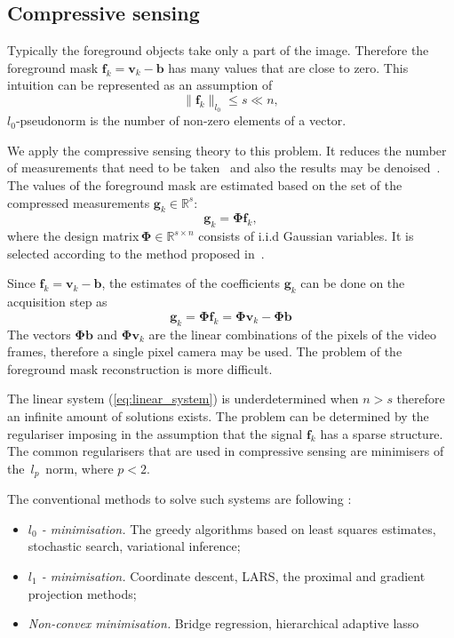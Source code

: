 \documentclass[conference]{IEEEtran}
\begin{document}
\subsection{Compressive sensing}
Typically the foreground objects take only a part of the image. Therefore the foreground mask $\mathbf{f}_k=\mathbf{v}_k-\mathbf{b}$ has many values that are close to zero. This intuition can be represented as an assumption of
\begin{equation}
\|\mathbf{f}_k\|_{l_0}\le s \ll n,
\end{equation}
$l_0$-pseudonorm is the number of non-zero elements of a vector.
 
We apply the compressive sensing theory to this problem. It reduces the number of measurements that need to be taken~\cite{Candes2008intro} and also the results may be denoised~\cite{Bach14}. The values of the foreground mask are estimated based on the set of the compressed measurements $\mathbf{g}_k \in \mathbb{R}^{s}$: 
\begin{equation}
\mathbf{g}_k = \mathbf{\Phi} \mathbf{f}_k, 
\end{equation}
where the design matrix\,$\mathbf{\Phi}\in\mathbb{R}^{s \times n}$ consists of i.i.d Gaussian variables. It is selected according to the method proposed in~\cite{Baraniuk08}.

Since $\mathbf{f}_k=\mathbf{v}_k-\mathbf{b}$, the estimates of the coefficients $\mathbf{g}_k$ can be done on the acquisition step as 
\begin{equation}
\label{eq:linear_system}
\mathbf{g}_k = \mathbf{\Phi} \mathbf{f}_k = \mathbf{\Phi} \mathbf{v}_k - \mathbf{\Phi} \mathbf{b}
\end{equation}
The vectors $\mathbf{\Phi} \mathbf{b}$ and $\mathbf{\Phi} \mathbf{v}_k$ are the linear combinations of the pixels of the video frames, therefore a single pixel camera may be used. The problem of the foreground mask reconstruction is more difficult. 

The linear system (\ref{eq:linear_system}) is underdetermined when $n > s$ therefore an infinite amount of solutions exists. The problem can be determined by the regulariser imposing in the assumption that the signal $\mathbf{f}_k$ has a sparse structure. The common regularisers that are used in compressive sensing are minimisers of the~$l_p$~norm, where $p < 2$.

The conventional methods to solve such systems are following \cite[Chapter 13]{Murphy2012}: 
\begin{itemize}
\item \textit{$l_0$ - minimisation.} The greedy algorithms based on least squares estimates, stochastic search, variational inference;
\item \textit{$l_1$ - minimisation.} Coordinate descent, LARS, the proximal and gradient projection methods;
\item \textit{Non-convex minimisation.} Bridge regression, hierarchical adaptive lasso
\end{itemize} 
\end{document}
